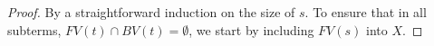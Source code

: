 \documentclass{lmcs}
\theoremstyle{theorem}\newtheorem{theorem}{Theorem}
\theoremstyle{theorem}\newtheorem{lemma}[theorem]{Lemma}
\theoremstyle{theorem}\newtheorem{corollary}[theorem]{Corollary}
\theoremstyle{definition}\newtheorem{definition}[theorem]{Definition}
\theoremstyle{definition}\newtheorem{example}[theorem]{Example}
\newcommand{\FV}{\mathit{FV}}
\newcommand{\BV}{\mathit{BV}}
\newcommand{\identifier}[1]{\mathtt{#1}}
\newcommand{\afun}{\identifier{f}}
\newcommand{\avar}{x}
\newcommand{\bvar}{y}
\newcommand{\cvar}{z}
\newcommand{\Cvar}{Z}
\newcommand{\abs}[2]{\lambda #1.#2}
\newcommand{\meta}[2]{#1\langle#2\rangle}
\newcommand{\tuple}[2]{\llparenthesis #1,\dots,#2 \rrparenthesis}
\begin{document}
\begin{proof}
By a straightforward induction on the size of $s$.  To ensure that in all
subterms, $\FV(t) \cap \BV(t) = \emptyset$, we start by including $\FV(s)$ into
$X$.

\end{proof}
\end{document}
